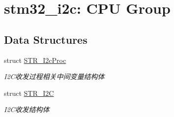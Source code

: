 \hypertarget{group___i2_c}{\section{stm32\-\_\-i2c\-: \-C\-P\-U \-Group}
\label{group___i2_c}
}
\subsection*{\-Data \-Structures}
\begin{DoxyCompactItemize}
\item 
struct \hyperlink{struct_s_t_r___i2c_proc}{\-S\-T\-R\-\_\-\-I2c\-Proc}
\begin{DoxyCompactList}\small\item\em \-I2\-C收发过程相关中间变量结构体 \end{DoxyCompactList}\item 
struct \hyperlink{struct_s_t_r___i2_c}{\-S\-T\-R\-\_\-\-I2\-C}
\begin{DoxyCompactList}\small\item\em \-I2\-C收发结构体 \end{DoxyCompactList}\end{DoxyCompactItemize}
